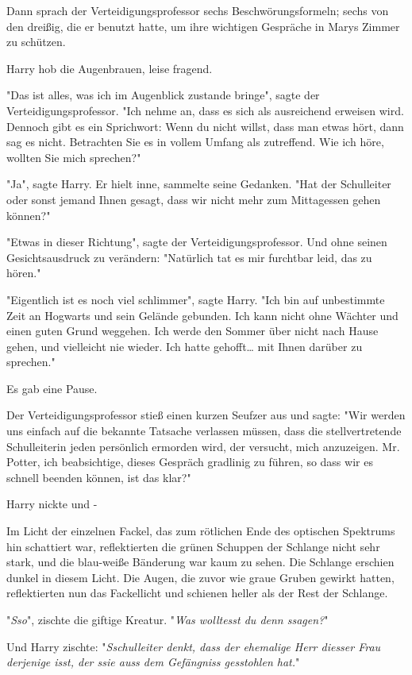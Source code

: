{Dann sprach der Verteidigungsprofessor sechs Beschwörungsformeln; sechs von den dreißig, die er benutzt hatte, um ihre wichtigen Gespräche in Marys Zimmer zu schützen.

Harry hob die Augenbrauen, leise fragend.

"Das ist alles, was ich im Augenblick zustande bringe", sagte der Verteidigungsprofessor. "Ich nehme an, dass es sich als ausreichend erweisen wird. Dennoch gibt es ein Sprichwort: Wenn du nicht willst, dass man etwas hört, dann sag es nicht. Betrachten Sie es in vollem Umfang als zutreffend. Wie ich höre, wollten Sie mich sprechen?"

"Ja", sagte Harry. Er hielt inne, sammelte seine Gedanken. "Hat der Schulleiter oder sonst jemand Ihnen gesagt, dass wir nicht mehr zum Mittagessen gehen können?"

"Etwas in dieser Richtung", sagte der Verteidigungsprofessor. Und ohne seinen Gesichtsausdruck zu verändern: "Natürlich tat es mir furchtbar leid, das zu hören."

"Eigentlich ist es noch viel schlimmer", sagte Harry. "Ich bin auf unbestimmte Zeit an Hogwarts und sein Gelände gebunden. Ich kann nicht ohne Wächter und einen guten Grund weggehen. Ich werde den Sommer über nicht nach Hause gehen, und vielleicht nie wieder. Ich hatte gehofft… mit Ihnen darüber zu sprechen."

Es gab eine Pause.

Der Verteidigungsprofessor stieß einen kurzen Seufzer aus und sagte: "Wir werden uns einfach auf die bekannte Tatsache verlassen müssen, dass die stellvertretende Schulleiterin jeden persönlich ermorden wird, der versucht, mich anzuzeigen. Mr. Potter, ich beabsichtige, dieses Gespräch gradlinig zu führen, so dass wir es schnell beenden können, ist das klar?"

Harry nickte und -

Im Licht der einzelnen Fackel, das zum rötlichen Ende des optischen Spektrums hin schattiert war, reflektierten die grünen Schuppen der Schlange nicht sehr stark, und die blau-weiße Bänderung war kaum zu sehen. Die Schlange erschien dunkel in diesem Licht. Die Augen, die zuvor wie graue Gruben gewirkt hatten, reflektierten nun das Fackellicht und schienen heller als der Rest der Schlange.

"\emph{Sso}", zischte die giftige Kreatur. "\emph{Was wolltesst du denn ssagen?}"

Und Harry zischte: "\emph{Sschulleiter denkt, dass der ehemalige Herr diesser Frau derjenige isst, der ssie auss dem Gefängniss gesstohlen hat.}"

}
